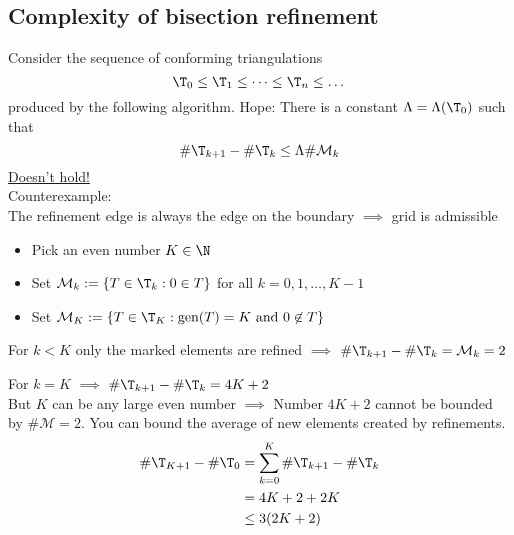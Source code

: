 \begin{enumerate}[label = \alph*)]
		\subsection{Complexity of bisection refinement}
		Consider the sequence of conforming triangulations 
		\begin{equation*}
			\T_{0} \leq \T_{1} \leq \dots \leq \T_{n} \leq \dots 
		\end{equation*}
		produced by the following algorithm.\nl
        \nl
		Hope: There is a constant $\Lambda = \Lambda(\T_{0})$ such that 
		\begin{equation*}
			\#\T_{k+1} - \#\T_{k} \leq \Lambda \# \mathcal{M}_{k}
		\end{equation*}
		\underline{Doesn't hold!}\\
		Counterexample:\\
		The refinement edge is always the edge on the boundary $\implies$ grid is admissible
		
		\begin{itemize}
			\item Pick an even number $K \in \N$ 
			\item Set $\mathcal{M}_{k} := \left\{ T \in \T_{k}: 0 \in T \right\} $ for all $k=0,1,\dots ,K-1$ 
			
			\item Set $\mathcal{M}_{K} := \left\{ T \in \T_{K}: \text{gen}(T)=K \text{ and } 0 \not\in T \right\}$ 
			
		\end{itemize}
		For $k < K$ only the marked elements are refined $\implies$ $\#\T_{k+1} - \#\T_{k} = \mathcal{M}_{k} = 2$	
		
		
		For $k=K$ $\implies$ $\#\T_{k+1} - \#\T_{k} = 4K +2$\\
		But $K$ can be any large even number $\implies$ Number $4K +2$ cannot be bounded by $\#\mathcal{M}=2$.\nl
		You can bound the average of new elements created by refinements.
		\begin{align*}
			\# \T_{K+1} - \# \T_{0} &= \sum\limits_{k=0}^{K} \# \T_{k+1} - \# \T_{k}\\
									&= 4K + 2 + 2K\\
									&\leq 3( 2K +2 )\\

\end{align*}
\end{enumerate}
